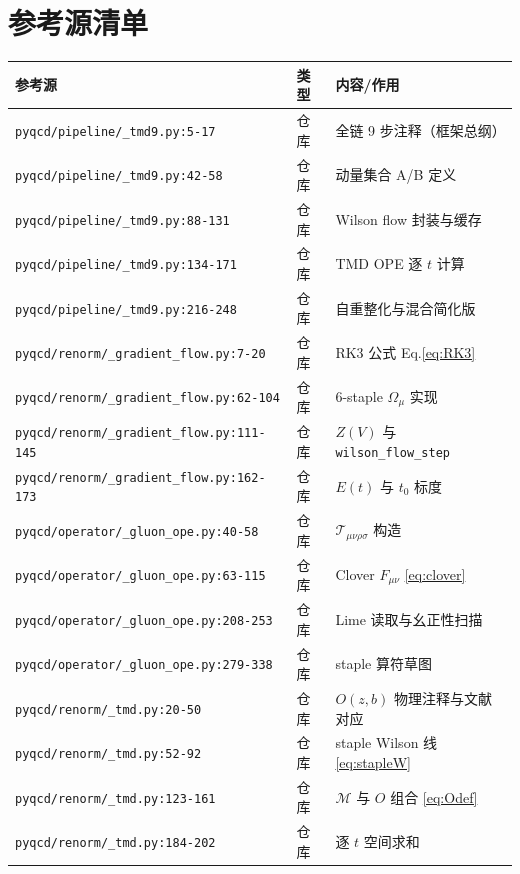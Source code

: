 \documentclass[UTF8]{ctexart}
\begin{document}
\section{参考源清单}
\label{sec:reflist}
\tiny
\begin{xltabular}{\textwidth}{llX}
\toprule
\textcolor{evidence}{参考源} & 类型 & 内容/作用 \\
\midrule
\endhead
\texttt{\nolinkurl{pyqcd/pipeline/\_tmd9.py:5-17}} & 仓库 & 全链 9 步注释（框架总纲）\\
\texttt{\nolinkurl{pyqcd/pipeline/\_tmd9.py:42-58}} & 仓库 & 动量集合 A/B 定义 \\
\texttt{\nolinkurl{pyqcd/pipeline/\_tmd9.py:88-131}} & 仓库 & Wilson flow 封装与缓存 \\
\texttt{\nolinkurl{pyqcd/pipeline/\_tmd9.py:134-171}} & 仓库 & TMD OPE 逐 $t$ 计算 \\
\texttt{\nolinkurl{pyqcd/pipeline/\_tmd9.py:216-248}} & 仓库 & 自重整化与混合简化版 \\
\texttt{\nolinkurl{pyqcd/renorm/\_gradient\_flow.py:7-20}} & 仓库 & RK3 公式 Eq.\eqref{eq:RK3} \\
\texttt{\nolinkurl{pyqcd/renorm/\_gradient\_flow.py:62-104}} & 仓库 & 6-staple $\Omega_\mu$ 实现 \\
\texttt{\nolinkurl{pyqcd/renorm/\_gradient\_flow.py:111-145}} & 仓库 & $Z(V)$ 与 \texttt{\nolinkurl{wilson\_flow\_step}} \\
\texttt{\nolinkurl{pyqcd/renorm/\_gradient\_flow.py:162-173}} & 仓库 & $E(t)$ 与 $t_0$ 标度 \\
\texttt{\nolinkurl{pyqcd/operator/\_gluon\_ope.py:40-58}} & 仓库 & $\mathcal{T}_{\mu\nu\rho\sigma}$ 构造 \\
\texttt{\nolinkurl{pyqcd/operator/\_gluon\_ope.py:63-115}} & 仓库 & Clover $F_{\mu\nu}$ \eqref{eq:clover} \\
\texttt{\nolinkurl{pyqcd/operator/\_gluon\_ope.py:208-253}} & 仓库 & Lime 读取与幺正性扫描 \\
\texttt{\nolinkurl{pyqcd/operator/\_gluon\_ope.py:279-338}} & 仓库 & staple 算符草图 \\
\texttt{\nolinkurl{pyqcd/renorm/\_tmd.py:20-50}} & 仓库 & $O(z,b)$ 物理注释与文献对应 \\
\texttt{\nolinkurl{pyqcd/renorm/\_tmd.py:52-92}} & 仓库 & staple Wilson 线 \eqref{eq:stapleW} \\
\texttt{\nolinkurl{pyqcd/renorm/\_tmd.py:123-161}} & 仓库 & $\mathcal{M}$ 与 $O$ 组合 \eqref{eq:Odef} \\
\texttt{\nolinkurl{pyqcd/renorm/\_tmd.py:184-202}} & 仓库 & 逐 $t$ 空间求和 \\

\end{xltabular}
\end{document}
